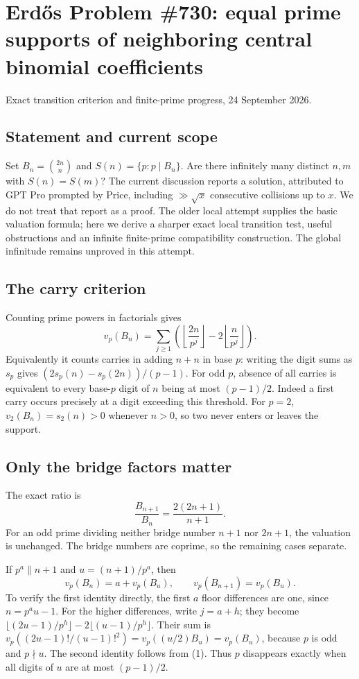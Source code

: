 \section{Erd\H{o}s Problem \#730: equal prime supports of neighboring central binomial coefficients}
\noindent Exact transition criterion and finite-prime progress, 24 September 2026.

\subsection*{Statement and current scope}
Set $B_n=\binom{2n}{n}$ and $S(n)=\{p:p\mid B_n\}$. Are there infinitely many distinct $n,m$ with $S(n)=S(m)$? The current discussion reports a solution, attributed to GPT Pro prompted by Price, including $\gg\sqrt x$ consecutive collisions up to $x$. We do not treat that report as a proof. The older local attempt supplies the basic valuation formula; here we derive a sharper exact local transition test, useful obstructions and an infinite finite-prime compatibility construction. The global infinitude remains unproved in this attempt.

\subsection*{The carry criterion}
Counting prime powers in factorials gives
\[
 v_p(B_n)=\sum_{j\geq1}
 \left(\left\lfloor\frac{2n}{p^j}\right\rfloor
      -2\left\lfloor\frac n{p^j}\right\rfloor\right).
\]
Equivalently it counts carries in adding $n+n$ in base $p$: writing the digit sums as $s_p$ gives $(2s_p(n)-s_p(2n))/(p-1)$.
For odd $p$, absence of all carries is equivalent to every base-$p$ digit of $n$ being at most $(p-1)/2$. Indeed a first carry occurs precisely at a digit exceeding this threshold. For $p=2$, $v_2(B_n)=s_2(n)>0$ whenever $n>0$, so two never enters or leaves the support.

\subsection*{Only the bridge factors matter}
The exact ratio is
\[
 \frac{B_{n+1}}{B_n}=\frac{2(2n+1)}{n+1}. \tag{1}
\]
For an odd prime dividing neither bridge number $n+1$ nor $2n+1$, the valuation is unchanged. The bridge numbers are coprime, so the remaining cases separate.

If $p^a\parallel n+1$ and $u=(n+1)/p^a$, then
\[
 v_p(B_n)=a+v_p(B_u),\qquad v_p(B_{n+1})=v_p(B_u). \tag{2}
\]
To verify the first identity directly, the first $a$ floor differences are one, since $n=p^au-1$. For the higher differences, write $j=a+h$; they become
$\lfloor(2u-1)/p^h\rfloor-2\lfloor(u-1)/p^h\rfloor$.
Their sum is $v_p((2u-1)!/(u-1)!^2)=v_p((u/2)B_u)=v_p(B_u)$, because $p$ is odd and $p\nmid u$. The second identity follows from (1).
Thus $p$ disappears exactly when all digits of $u$ are at most $(p-1)/2$.

